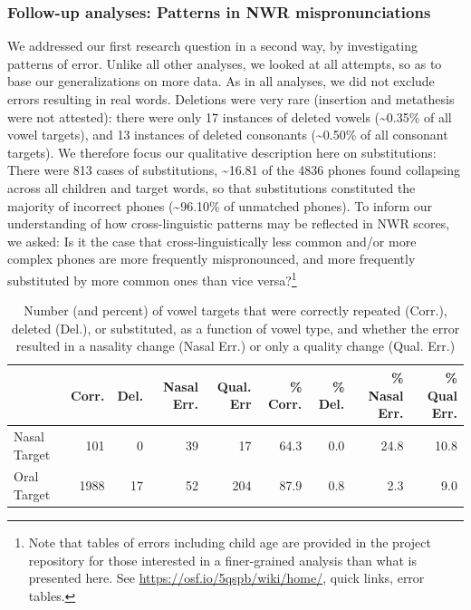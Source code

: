 \documentclass[
  american,
  ,man,floatsintext]{apa6}
\begin{document}
\hypertarget{follow-up-analyses-patterns-in-nwr-mispronunciations}{%
\subsubsection{Follow-up analyses: Patterns in NWR mispronunciations}\label{follow-up-analyses-patterns-in-nwr-mispronunciations}}

We addressed our first research question in a second way, by investigating patterns of error. Unlike all other analyses, we looked at all attempts, so as to base our generalizations on more data. As in all analyses, we did not exclude errors resulting in real words. Deletions were very rare (insertion and metathesis were not attested): there were only 17 instances of deleted vowels (\textasciitilde0.35\% of all vowel targets), and 13 instances of deleted consonants (\textasciitilde0.50\% of all consonant targets). We therefore focus our qualitative description here on substitutions: There were 813 cases of substitutions, \textasciitilde16.81 of the 4836 phones found collapsing across all children and target words, so that substitutions constituted the majority of incorrect phones (\textasciitilde96.10\% of unmatched phones). To inform our understanding of how cross-linguistic patterns may be reflected in NWR scores, we asked: Is it the case that cross-linguistically less common and/or more complex phones are more frequently mispronounced, and more frequently substituted by more common ones than vice versa?\footnote{Note that tables of errors including child age are provided in the project repository for those interested in a finer-grained analysis than what is presented here. See \url{https://osf.io/5qspb/wiki/home/}, quick links, error tables.}

\begin{table}

\caption{\label{tab:tab-v}Number (and percent) of vowel targets that were correctly repeated (Corr.), deleted (Del.), or substituted, as a function of vowel type, and whether the error resulted in a nasality change (Nasal Err.) or only a quality change (Qual. Err.)}
\centering
\begin{tabular}[t]{lrrrrrrrr}
\toprule
  & Corr. & Del. & Nasal Err. & Qual. Err & \% Corr. & \% Del. & \% Nasal Err. & \% Qual Err.\\
\midrule
Nasal Target & 101 & 0 & 39 & 17 & 64.3 & 0.0 & 24.8 & 10.8\\
Oral Target & 1988 & 17 & 52 & 204 & 87.9 & 0.8 & 2.3 & 9.0\\
\bottomrule
\end{tabular}
\end{table}
\end{document}
